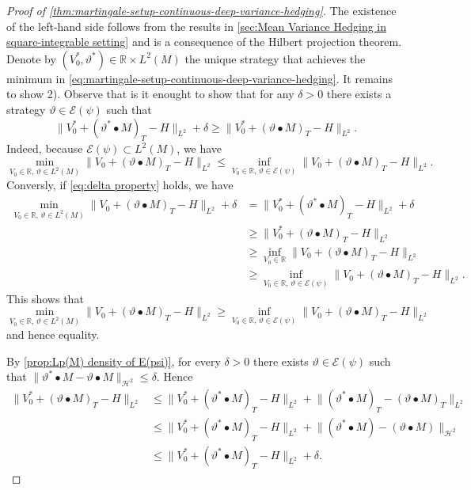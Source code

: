 \documentclass[11pt,a4paper,twoside,openany]{report}
\theoremstyle{plain} %
\theoremstyle{definition} %
\theoremstyle{remark} %
\begin{document}
\begin{proof}[Proof of \cref{thm:martingale-setup-continuous-deep-variance-hedging}]
    The existence of the left-hand side follows from the results in \cref{sec:Mean Variance Hedging in square-integrable setting} and is a consequence of the Hilbert projection theorem. Denote by \((V_0^*,\vartheta^*)\in\mathbb{R}\times L^2(M)\) the unique strategy that achieves the minimum in \cref{eq:martingale-setup-continuous-deep-variance-hedging}. It remains to show 2). Observe that is it enought to show that for any \(\delta>0\) there exists a strategy \(\vartheta\in\mathcal{E}(\psi)\) such that 
    \begin{equation}\label{eq:delta property}
       \lVert V_0^*+(\vartheta^*\bullet M)_T-H\rVert_{L^2}+\delta\geq \lVert V_0^*+(\vartheta\bullet M)_T-H\rVert_{L^2}.
    \end{equation}
Indeed, because \(\mathcal{E}(\psi)\subset L^2(M)\), we have 
\begin{equation*}
    \min_{V_0\in\mathbb{R},\,\vartheta\in L^2(M)}\lVert V_0+(\vartheta\bullet M)_T-H\rVert_{L^2}\leq \inf_{V_0\in\mathbb{R},\,\vartheta\in\mathcal{E}(\psi)}\lVert V_0+(\vartheta\bullet M)_T-H\rVert_{L^2}.
\end{equation*}
Conversly, if \cref{eq:delta property} holds, we have
\begin{align*}
     \min_{V_0\in\mathbb{R},\,\vartheta\in L^2(M)}\lVert V_0+(\vartheta\bullet M)_T-H\rVert_{L^2}+\delta&=\lVert V_0^*+(\vartheta^*\bullet M)_T-H\rVert_{L^2}+\delta
     \\&\geq \lVert V_0^*+(\vartheta\bullet M)_T-H\rVert_{L^2}
     \\&\geq\inf_{V_0\in\mathbb{R}}\lVert V_0+(\vartheta\bullet M)_T-H\rVert_{L^2}
     \\&\geq \inf_{V_0\in\mathbb{R},\,\vartheta\in\mathcal{E}(\psi)}\lVert V_0+(\vartheta\bullet M)_T-H\rVert_{L^2}.
\end{align*}
This shows that 
\begin{equation*}
    \min_{V_0\in\mathbb{R},\,\vartheta\in L^2(M)}\lVert V_0+(\vartheta\bullet M)_T-H\rVert_{L^2}\geq\inf_{V_0\in\mathbb{R},\,\vartheta\in\mathcal{E}(\psi)}\lVert V_0+(\vartheta\bullet M)_T-H\rVert_{L^2}
\end{equation*}
and hence equality.


    By \cref{prop:Lp(M) density of E(psi)}, for every \(\delta>0\) there exists \(\vartheta\in\mathcal{E}(\psi)\) such that \(\lVert \vartheta
    ^*\bullet M-\vartheta\bullet M\rVert_{\mathcal{H}^2}\leq\delta\). Hence
    \begin{align*}
        \lVert V_0^*+(\vartheta\bullet M)_{T}-H\rVert_{L^2}&\leq\lVert V_0^*+(\vartheta^*\bullet M)_{T}-H\rVert_{L^2}+\lVert (\vartheta^*\bullet M)_{T}-(\vartheta\bullet M)_{T}\rVert_{L^2}\\
        &\leq\lVert V_0^*+(\vartheta^*\bullet M)_{T}-H\rVert_{L^2}+\lVert (\vartheta^*\bullet M)-(\vartheta\bullet M)\rVert_{\mathcal{H}^2}
        \\&\leq\lVert V_0^*+(\vartheta^*\bullet M)_{T}-H\rVert_{L^2}+\delta.
    \end{align*}
\end{proof}
\end{document}
